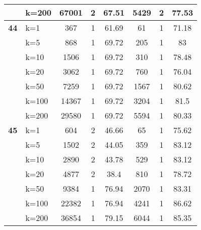 \begin{table}[htbp]
\begin{tabular}{|l|l|c|c|c|c|c|c|}
     & k=200 & 67001 & 2 & 67.51 & 5429 & 2 & 77.53 \\ \hline
    \multicolumn{1}{|r|}{\textbf{44}} & k=1 & 367 & 1 & 61.69 & 61 & 1 & 71.18 \\ 
     & k=5 & 868 & 1 & 69.72 & 205 & 1 & 83 \\ 
     & k=10 & 1506 & 1 & 69.72 & 310 & 1 & 78.48 \\ 
     & k=20 & 3062 & 1 & 69.72 & 760 & 1 & 76.04 \\ 
     & k=50 & 7259 & 1 & 69.72 & 1567 & 1 & 80.62 \\ 
     & k=100 & 14367 & 1 & 69.72 & 3204 & 1 & 81.5 \\ 
     & k=200 & 29580 & 1 & 69.72 & 5594 & 1 & 80.33 \\ \hline
    \multicolumn{1}{|r|}{\textbf{45}} & k=1 & 604 & 2 & 46.66 & 65 & 1 & 75.62 \\ 
     & k=5 & 1502 & 2 & 44.05 & 359 & 1 & 83.12 \\ 
     & k=10 & 2890 & 2 & 43.78 & 529 & 1 & 83.12 \\ 
     & k=20 & 4877 & 2 & 38.4 & 810 & 1 & 78.72 \\ 
     & k=50 & 9384 & 1 & 76.94 & 2070 & 1 & 83.31 \\ 
     & k=100 & 22382 & 1 & 76.94 & 4241 & 1 & 86.62 \\ 
     & k=200 & 36854 & 1 & 79.15 & 6044 & 1 & 85.35 \\ \hline
    \end{tabular}
\end{table}
